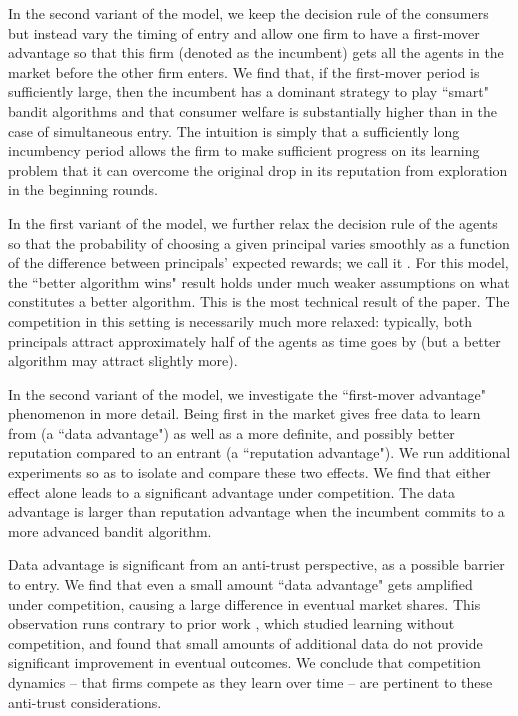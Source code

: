 {In the second variant of the model, we keep the decision rule of the consumers but instead vary the timing of entry and allow one firm to have a first-mover advantage so that this firm (denoted as the incumbent) gets all the agents in the market before the other firm enters. We find that, if the first-mover period is sufficiently large, then the incumbent has a dominant strategy to play ``smart" bandit algorithms and that consumer welfare is substantially higher than in the case of simultaneous entry. The intuition is simply that a sufficiently long incumbency period allows the firm to make sufficient progress on its learning problem that it can overcome the original drop in its reputation from exploration in the beginning rounds.

 In the first variant of the model, we further relax the decision rule of the agents so that the probability of choosing a given principal varies smoothly as a function of the difference between  principals' expected rewards; we call it \SoftMaxRandom. For this model, the ``better algorithm wins" result holds under much weaker assumptions on what constitutes a better algorithm. This is the most technical result of the paper. The competition in this setting is necessarily much more relaxed: typically, both principals attract approximately half of the agents as time goes by (but a better algorithm may attract slightly more).

In the second variant of the model, we investigate the ``first-mover advantage" phenomenon in more detail. Being first in the market gives free data to learn from (a ``data advantage") as well as a more definite, and possibly better reputation compared to an entrant (a ``reputation advantage"). We run additional experiments so as to isolate and compare these two effects. We find that either effect alone leads to a significant advantage under competition. The data advantage is larger than reputation advantage when the incumbent commits to a more advanced bandit algorithm.

Data advantage is significant from an anti-trust perspective, as a possible barrier to entry. We find that even a small amount ``data advantage" gets amplified under competition, causing a large difference in eventual market shares. This observation runs contrary to prior work  \cite{lambrecht2015can,bajari2018impact}, which studied learning without competition, and found that small amounts of additional data do not provide significant improvement in eventual outcomes. We conclude that competition dynamics -- that firms compete as they learn over time -- are pertinent to these anti-trust considerations.

}
